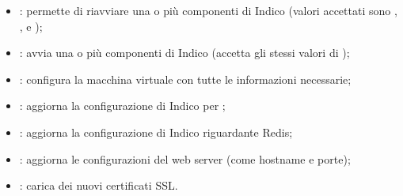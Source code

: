         \begin{itemize}
            \item {}: permette di riavviare una o più componenti di Indico (valori accettati sono , ,  e );
            \item {}: avvia una o più componenti di Indico (accetta gli stessi valori di );
            \item {}: configura la macchina virtuale con tutte le informazioni necessarie;
            \item {}: aggiorna la configurazione di Indico per ;
            \item {}: aggiorna la configurazione di Indico riguardante Redis;
            \item {}: aggiorna le configurazioni del web server (come hostname e porte);
            \item {}: carica dei nuovi certificati \ac{SSL}.
        \end{itemize}
    